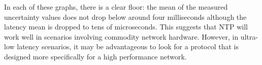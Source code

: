 In each of these graphs, there is a clear floor: the mean of the measured uncertainty values does not drop below
around four milliseconds although the latency mean is dropped to tens of microseconds. This suggests that
NTP will work well in scenarios involving commodity network hardware. However, in ultra-low latency scenarios, 
it may be advantageous to look for a protocol that is designed more specifically for a high
performance network. 











